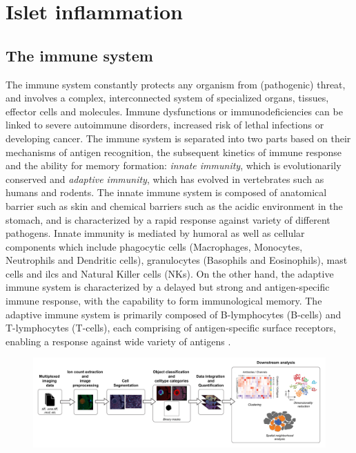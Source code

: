 
\section{Islet inflammation}  %
\label{sec:inflammation}

\subsection{The immune system}

\par The immune system constantly protects any organism from (pathogenic) threat, and involves a complex, interconnected system of specialized organs, tissues, effector cells and molecules. Immune dysfunctions or immunodeficiencies can be linked to severe autoimmune disorders, increased risk of lethal infections or developing cancer. The immune system is separated into two parts based on their mechanisms of antigen recognition, the subsequent kinetics of immune response and the ability for memory formation: \textit{innate immunity}, which is evolutionarily conserved and \textit{adaptive immunity}, which has evolved in vertebrates such as humans and rodents. The innate immune system is composed of anatomical barrier such as skin and chemical barriers such as the acidic environment in the stomach, and is characterized by a rapid response against variety of different pathogens. Innate immunity is mediated by humoral as well as cellular components which include phagocytic cells (Macrophages, Monocytes, Neutrophils and Dendritic cells), granulocytes (Basophils and Eosinophils), mast cells and \glspl{ilc} and Natural Killer cells (NKs). On the other hand, the adaptive immune system is characterized by a delayed but strong and antigen-specific immune response, with the capability to form immunological memory. The adaptive immune system is primarily composed of B-lymphocytes (B-cells) and T-lymphocytes (T-cells), each comprising of antigen-specific surface receptors, enabling a response against wide variety of antigens \textbf{\cite{chaplin_overview_2010,marshall_introduction_2018,murphy_janeways_2017}}.

\begin{figure}[H]
    \centering
    \includegraphics{Chapter1/Fig/F1-14-01.png}
    \caption[Overvieww of immune system]{}
    \label{fig:chp1_immunesystem}
\end{figure}

